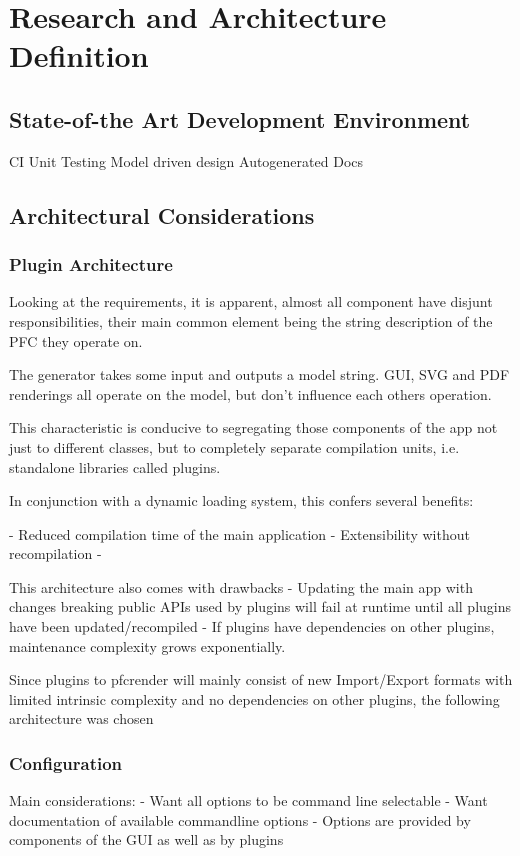 \chapter{Research and Architecture Definition}

\section{State-of-the Art Development Environment}
CI
Unit Testing
Model driven design
Autogenerated Docs
\section{Architectural Considerations}

\subsection{Plugin Architecture}
Looking at the requirements, it is apparent, almost all component have disjunt responsibilities, their main common element being the string description of the PFC they operate on.

The  generator takes some input and outputs a model string. GUI, SVG and PDF renderings all operate on the model, but don't influence each others operation.

This characteristic is conducive to segregating those components of the app not just to different classes, but to completely separate compilation units, i.e. standalone libraries called plugins.

In conjunction with a dynamic loading system, this confers several benefits:

- Reduced compilation time of the main application
- Extensibility without recompilation
- 

This architecture also comes with drawbacks
- Updating the main app with changes breaking public APIs used by plugins will fail at runtime until all plugins have been updated/recompiled
- If plugins have dependencies on other plugins, maintenance complexity grows exponentially.

Since plugins to pfcrender will mainly consist of new Import/Export formats with limited intrinsic complexity and no dependencies on other plugins, the following architecture was chosen




\subsection{Configuration}
Main considerations:
- Want all options to be command line selectable
- Want documentation of available commandline options
- Options are provided by components of the GUI as well as by plugins

